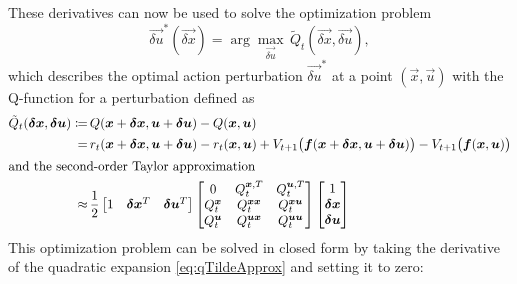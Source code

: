 			These derivatives can now be used to solve the optimization problem
			\begin{equation*}
				\vec{\delta u}^\ast(\vec{\delta x}) = \arg\max_{\vec{\delta u}}\, \tilde{Q}_t(\vec{\delta x}, \vec{\delta u}),
			\end{equation*}
			which describes the optimal action perturbation \( \vec{\delta u}^\ast \) at a point \( (\vec{x}, \vec{u}) \) with the Q-function for a perturbation defined as
			\begin{align}
				\tilde{Q}_t(\vec{\delta x}, \vec{\delta u})
					\coloneqq&\, Q(\vec{x} + \vec{\delta x}, \vec{u} + \vec{\delta u}) - Q(\vec{x}, \vec{u})  \nonumber \\
					=&\, r_t(\vec{x} + \vec{\delta x}, \vec{u} + \vec{\delta u}) - r_t(\vec{x}, \vec{u}) + V_{t + 1}\big( \vec{f}(\vec{x} + \vec{\delta x}, \vec{u} + \vec{\delta u}) \big) -  V_{t + 1}\big( \vec{f}(\vec{x}, \vec{u}) \big)  \nonumber \\
				\intertext{and the second-order Taylor approximation}
					\approx&\, \frac{1}{2}
						\begin{bmatrix}
							1 & \vec{\delta x}^T & \vec{\delta u}^T
						\end{bmatrix}
						\begin{bmatrix}
							0             & Q_t^{\vec{x}, T}      & Q_t^{\vec{u}, T}      \\
							Q_t^{\vec{x}} & Q_t^{\vec{x} \vec{x}} & Q_t^{\vec{x} \vec{u}} \\
							Q_t^{\vec{u}} & Q_t^{\vec{u} \vec{x}} & Q_t^{\vec{u} \vec{u}}
						\end{bmatrix}
						\begin{bmatrix}
							1 \\
							\vec{\delta x} \\
							\vec{\delta u}
						\end{bmatrix}  \label{eq:qTildeApprox}
			\end{align}
			This optimization problem can be solved in closed form by taking the derivative of the quadratic expansion \eqref{eq:qTildeApprox} and setting it to zero:
